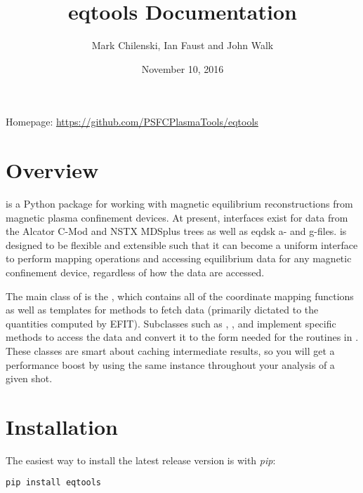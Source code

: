 \documentclass[letterpaper,10pt,english]{sphinxmanual}
\title{eqtools Documentation}
\date{November 10, 2016}
\author{Mark Chilenski, Ian Faust and John Walk}
\begin{document}
\maketitle
\tableofcontents
{}\label{index::doc}


Homepage: \href{https://github.com/PSFCPlasmaTools/eqtools}{https://github.com/PSFCPlasmaTools/eqtools}


\chapter{Overview}
\label{index:overview}\label{index:eqtools-tools-for-interacting-with-magnetic-equilibria}
{\hyperref[eqtools:module-eqtools]{}} is a Python package for working with magnetic equilibrium reconstructions from magnetic plasma confinement devices. At present, interfaces exist for data from the Alcator C-Mod and NSTX MDSplus trees as well as eqdsk a- and g-files. {\hyperref[eqtools:module-eqtools]{}} is designed to be flexible and extensible such that it can become a uniform interface to perform mapping operations and accessing equilibrium data for any magnetic confinement device, regardless of how the data are accessed.

The main class of {\hyperref[eqtools:module-eqtools]{}} is the {\hyperref[eqtools:eqtools.core.Equilibrium]{}}, which contains all of the coordinate mapping functions as well as templates for methods to fetch data (primarily dictated to the quantities computed by EFIT). Subclasses such as {\hyperref[eqtools:eqtools.EFIT.EFITTree]{}}, {\hyperref[eqtools:eqtools.CModEFIT.CModEFITTree]{}}, {\hyperref[eqtools:eqtools.NSTXEFIT.NSTXEFITTree]{}} and {\hyperref[eqtools:eqtools.eqdskreader.EqdskReader]{}} implement specific methods to access the data and convert it to the form needed for the routines in {\hyperref[eqtools:eqtools.core.Equilibrium]{}}. These classes are smart about caching intermediate results, so you will get a performance boost by using the same instance throughout your analysis of a given shot.


\chapter{Installation}
\label{index:installation}
The easiest way to install the latest release version is with \emph{pip}:

\begin{Verbatim}[commandchars=\\\{\}]
pip install eqtools
\end{Verbatim}
\end{document}
